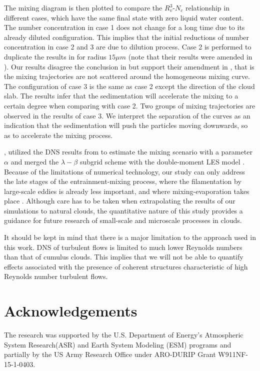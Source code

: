 \documentclass[draft,jgrga]{AGUTeX}
\begin{document}
\begin{article}
The mixing diagram is then plotted to compare the $R_v^3$-$N_c$ relationship in different cases, which have the same final state with zero liquid water content. The number concentration in case 1 does not change for a long time due to its already diluted configuration. This implies that the initial reductions of number concentration in case 2 and 3 are due to dilution process. Case 2 is performed to duplicate the results in \cite{Kumar14} for radius $15\mu m$ (note that their results were amended in \cite{Kumar16Corr}). Our results disagree the conclusion in \cite{Kumar14} but support their amendment in \cite{Kumar16Corr}, that is the mixing trajectories are not scattered around the homogeneous mixing curve. The configuration of case 3 is the same as case 2 except the direction of the cloud slab. The results infer that the sedimentation will accelerate the mixing to a certain degree when comparing with case 2. Two groups of mixing trajectories are observed in the results of case 3. We interpret the separation of the curves as an indication that the sedimentation will push the particles moving downwards, so as to accelerate the mixing process.

\cite{Jarecka2013}, utilized the DNS results from \citep{And04, And06, And09} to estimate the mixing scenario with a parameter $\alpha$ and merged the $\lambda-\beta$ subgrid scheme \cite{Jarecka2009} with the double-moment LES model \cite{Morrison2008}. Because of the limitations of numerical technology, our study can only address the late stages of the entrainment-mixing process, where the filamentation by large-scale eddies is already less important, and where mixing-evaporation takes place \cite{Jensen1989}. Although care has to be taken when extrapolating the results of our simulations to natural clouds, the quantitative nature of this study provides a guidance for future research of small-scale and microscale processes in clouds. 

It should be kept in mind that there is a major limitation to the approach used in this work. DNS of turbulent flows is limited to much lower Reynolds numbers than that of cumulus clouds. This implies that we will not be able to quantify effects associated with the presence of coherent structures characteristic of high Reynolds number turbulent flows.

\section{Acknowledgements}
The research was supported by the U.S. Department of Energy's Atmospheric System Research(ASR) and Earth System Modeling (ESM) programs and partially by the US Army Research Office under ARO-DURIP Grant W911NF-15-1-0403.



\end{article}
\end{document}
